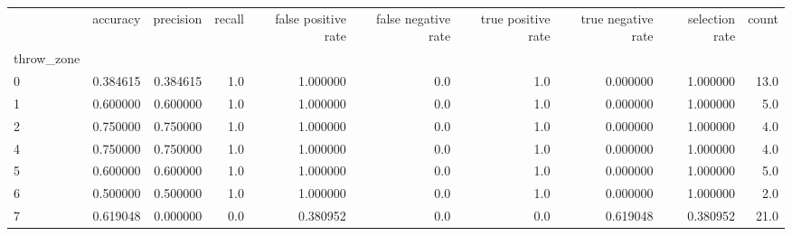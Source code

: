 \begin{tabular}{lrrrrrrrrr}
\toprule
{} &  accuracy &  precision &  recall &  false positive rate &  false negative rate &  true positive rate &  true negative rate &  selection rate &  count \\
throw\_zone &           &            &         &                      &                      &                     &                     &                 &        \\
\midrule
0          &  0.384615 &   0.384615 &     1.0 &             1.000000 &                  0.0 &                 1.0 &            0.000000 &        1.000000 &   13.0 \\
1          &  0.600000 &   0.600000 &     1.0 &             1.000000 &                  0.0 &                 1.0 &            0.000000 &        1.000000 &    5.0 \\
2          &  0.750000 &   0.750000 &     1.0 &             1.000000 &                  0.0 &                 1.0 &            0.000000 &        1.000000 &    4.0 \\
4          &  0.750000 &   0.750000 &     1.0 &             1.000000 &                  0.0 &                 1.0 &            0.000000 &        1.000000 &    4.0 \\
5          &  0.600000 &   0.600000 &     1.0 &             1.000000 &                  0.0 &                 1.0 &            0.000000 &        1.000000 &    5.0 \\
6          &  0.500000 &   0.500000 &     1.0 &             1.000000 &                  0.0 &                 1.0 &            0.000000 &        1.000000 &    2.0 \\
7          &  0.619048 &   0.000000 &     0.0 &             0.380952 &                  0.0 &                 0.0 &            0.619048 &        0.380952 &   21.0 \\
\bottomrule
\end{tabular}
